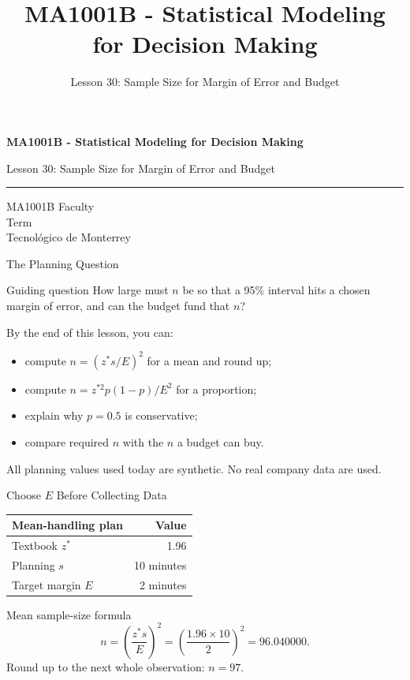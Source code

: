 \documentclass[aspectratio=169,10pt,english]{beamer}
\title{MA1001B - Statistical Modeling for Decision Making}
\subtitle{Lesson 30: Sample Size for Margin of Error and Budget}
\author{}
\institute{Tecnol\'ogico de Monterrey}
\date{}
\begin{document}
\begin{frame}[plain]
  \vspace{1.2cm}
  {\Large\bfseries MA1001B - Statistical Modeling for Decision Making\par}
  \vspace{0.7cm}
  {\large Lesson 30: Sample Size for Margin of Error and Budget\par}
  \vspace{0.7cm}
  {\color{TecRojo}\rule{\textwidth}{1.2pt}}
  \vspace{0.8cm}

  MA1001B Faculty\\[0.3cm]
  Term\\[0.3cm]
  Tecnol\'ogico de Monterrey
\end{frame}

\begin{frame}{The Planning Question}
  \begin{alertblock}{Guiding question}
    How large must $n$ be so that a 95\% interval hits a chosen margin of
    error, and can the budget fund that $n$?
  \end{alertblock}

  \vspace{0.6em}
  By the end of this lesson, you can:
  \begin{itemize}
    \item compute $n=(z^{*}s/E)^{2}$ for a mean and round up;
    \item compute $n=z^{*2}p(1-p)/E^{2}$ for a proportion;
    \item explain why $p=0.5$ is conservative;
    \item compare required $n$ with the $n$ a budget can buy.
  \end{itemize}

  \vfill
  \scriptsize All planning values used today are synthetic. No real company data are used.
\end{frame}

\begin{frame}{Choose $E$ Before Collecting Data}
  \small
  \begin{center}
    \begin{tabular}{lr}
      \toprule
      \textbf{Mean-handling plan} & \textbf{Value} \\
      \midrule
      Textbook $z^{*}$ & 1.96 \\
      Planning $s$ & 10 minutes \\
      Target margin $E$ & 2 minutes \\
      \bottomrule
    \end{tabular}
  \end{center}

  \vspace{0.5em}
  \begin{exampleblock}{Mean sample-size formula}
    \[
      n=\left(\frac{z^{*}s}{E}\right)^{2}=\left(\frac{1.96\times 10}{2}\right)^{2}=96.040000.
    \]
    Round up to the next whole observation: $n=97$.
  \end{exampleblock}
\end{frame}
\end{document}
